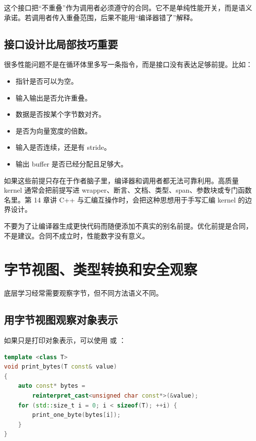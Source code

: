 这个接口把“不重叠”作为调用者必须遵守的合同。它不是单纯性能开关，而是语义承诺。若调用者传入重叠范围，后果不能用“编译器错了”解释。

\subsection{接口设计比局部技巧重要}

很多性能问题不是在循环体里多写一条指令，而是接口没有表达足够前提。比如：

\begin{itemize}
  \item 指针是否可以为空。
  \item 输入输出是否允许重叠。
  \item 数据是否按某个字节数对齐。
  \item {} 是否为向量宽度的倍数。
  \item 输入是否连续，还是有 stride。
  \item 输出 buffer 是否已经分配且足够大。
\end{itemize}

如果这些前提只存在于作者脑子里，编译器和调用者都无法可靠利用。高质量 kernel 通常会把前提写进 wrapper、断言、文档、类型、span、参数块或专门函数名里。第 14 章讲 C++ 与汇编互操作时，会把这种思想用于手写汇编 kernel 的边界设计。

\begin{warningbox}
不要为了让编译器生成更快代码而随便添加不真实的别名前提。优化前提是合同，不是建议。合同不成立时，性能数字没有意义。
\end{warningbox}

\section{字节视图、类型转换和安全观察}

底层学习经常需要观察字节，但不同方法语义不同。

\subsection{用字节视图观察对象表示}

如果只是打印对象表示，可以使用  或 ：

\begin{lstlisting}[language=C++]
template <class T>
void print_bytes(T const& value)
{
    auto const* bytes =
        reinterpret_cast<unsigned char const*>(&value);
    for (std::size_t i = 0; i < sizeof(T); ++i) {
        print_one_byte(bytes[i]);
    }
}
\end{lstlisting}

